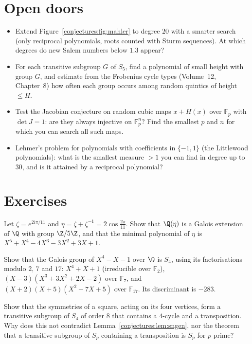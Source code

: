\section{Open doors}

\begin{itemize}
\item Extend Figure~\ref{conjectures:fig:mahler} to degree $20$ with a smarter search (only reciprocal polynomials, roots counted with Sturm sequences). At which degrees
do new Salem numbers below $1.3$ appear?
\item For each transitive subgroup $G$ of $S_5$, find a polynomial of small height with group $G$, and estimate from the Frobenius cycle types (Volume~12,
Chapter~8) how often each group occurs among random quintics of height $\le H$.
\item Test the Jacobian conjecture on random cubic maps $x+H(x)$ over $\mathbb F_p$ with $\det J=1$: are they always injective on $\mathbb F_p^n$? Find the
smallest $p$ and $n$ for which you can search all such maps.
\item Lehmer's problem for polynomials with coefficients in $\{-1,1\}$ (the Littlewood polynomials): what is the smallest measure $>1$ you can find in
degree up to $30$, and is it attained by a reciprocal polynomial?
\end{itemize}

\section{Exercises}

\begin{exercise}[$\star\star$]\label{conjectures:ex:period}
Let $\zeta=e^{2i\pi/11}$ and $\eta=\zeta+\zeta^{-1}=2\cos\frac{2\pi}{11}$. Show that $\Q(\eta)$ is a Galois extension of $\Q$ with group $\Z/5\Z$, and that
the minimal polynomial of $\eta$ is $X^5+X^4-4X^3-3X^2+3X+1$.
\end{exercise}

\begin{exercise}[$\star\star$]\label{conjectures:ex:x4}
Show that the Galois group of $X^4-X-1$ over $\Q$ is $S_4$, using its factorisations modulo $2$, $7$ and $17$:
$X^4+X+1$ (irreducible over $\mathbb F_2$), $(X-3)(X^3+3X^2+2X-2)$ over $\mathbb F_7$, and $(X+2)(X+5)(X^2-7X+5)$ over $\mathbb F_{17}$. Its discriminant
is $-283$.
\end{exercise}

\begin{exercise}[$\star\star$]\label{conjectures:ex:dihedral}
Show that the symmetries of a square, acting on its four vertices, form a transitive subgroup of $S_4$ of order $8$ that contains a $4$-cycle and a
transposition. Why does this not contradict Lemma~\ref{conjectures:lem:sngen}, nor the theorem that a transitive subgroup of $S_p$ containing a transposition is $S_p$
for $p$ prime?
\end{exercise}

